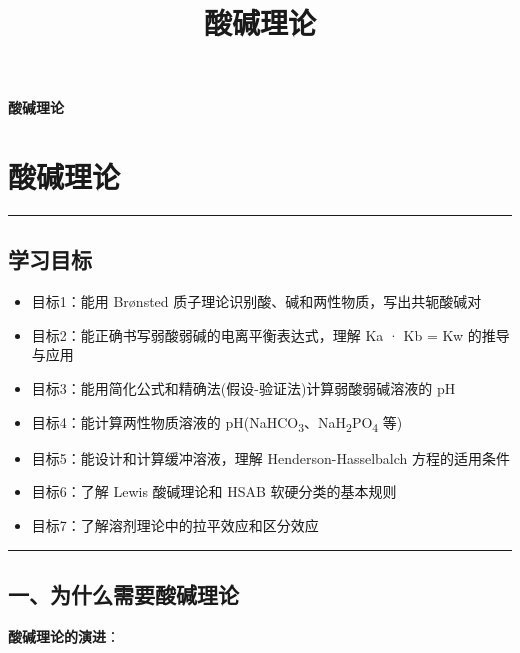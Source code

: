 \documentclass[a4paper,11pt]{ctexart}
\title{酸碱理论}
\date{}
\providecommand{\tightlist}{\setlength{\itemsep}{0pt}\setlength{\parskip}{0pt}}
\newcommand{\箭}{\ensuremath{\rightarrow}}
\newcommand{\左箭}{\ensuremath{\leftarrow}}
\newcommand{\上箭}{\ensuremath{\uparrow}}
\newcommand{\下箭}{\ensuremath{\downarrow}}
\newcommand{\衡}{\ensuremath{\rightleftharpoons}}
\newcommand{\双箭}{\ensuremath{\leftrightarrow}}
\newcommand{\约等于}{\ensuremath{\approx}}
\newcommand{\小于等于}{\ensuremath{\leq}}
\newcommand{\大于等于}{\ensuremath{\geq}}
\newcommand{\不等于}{\ensuremath{\neq}}
\newcommand{\西格马}{\ensuremath{\sigma}}
\newcommand{\派}{\ensuremath{\pi}}
\begin{document}
\thispagestyle{plain}
\begin{center}
{\bfseries 酸碱理论\par}
\end{center}
\vspace{1em}
\section{酸碱理论}\label{ux9178ux78b1ux7406ux8bba}

\begin{center}\rule{0.5\linewidth}{0.5pt}\end{center}

\subsection{学习目标}\label{ux5b66ux4e60ux76eeux6807}

\begin{itemize}
\tightlist
\item
  目标1：能用 Brønsted 质子理论识别酸、碱和两性物质，写出共轭酸碱对
\item
  目标2：能正确书写弱酸弱碱的电离平衡表达式，理解 Ka · Kb = Kw 的推导与应用
\item
  目标3：能用简化公式和精确法(假设-验证法)计算弱酸弱碱溶液的 pH
\item
  目标4：能计算两性物质溶液的 pH(NaHCO\textsubscript{3}、NaH\textsubscript{2}PO\textsubscript{4} 等)
\item
  目标5：能设计和计算缓冲溶液，理解 Henderson-Hasselbalch 方程的适用条件
\item
  目标6：了解 Lewis 酸碱理论和 HSAB 软硬分类的基本规则
\item
  目标7：了解溶剂理论中的拉平效应和区分效应
\end{itemize}

\begin{center}\rule{0.5\linewidth}{0.5pt}\end{center}

\subsection{一、为什么需要酸碱理论}\label{ux4e00ux4e3aux4ec0ux4e48ux9700ux8981ux9178ux78b1ux7406ux8bba}

\textbf{酸碱理论的演进}：
\end{document}
